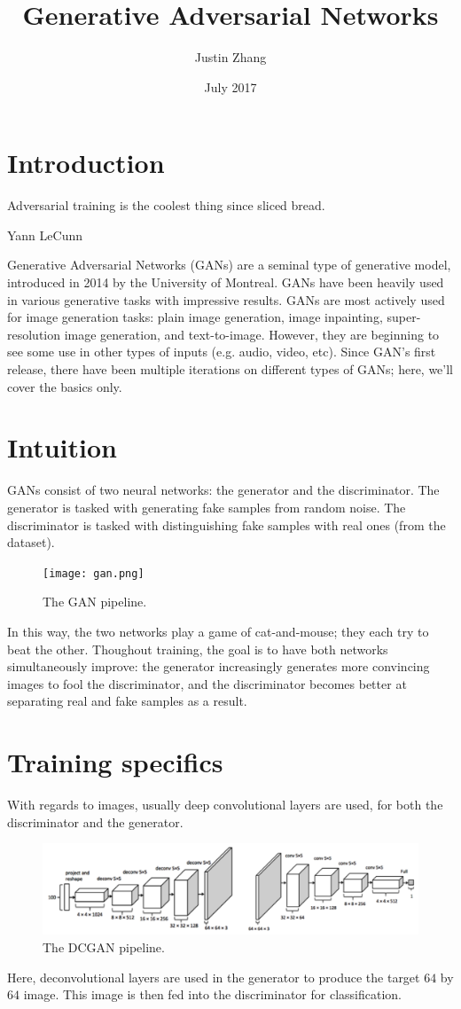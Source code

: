 \documentclass{article}
\title{Generative Adversarial Networks}
\author{Justin Zhang}
\date{July 2017}
\begin{document}
\maketitle

\section{Introduction}
\epigraph{Adversarial training is the coolest thing since sliced bread.}{Yann LeCunn}
    Generative Adversarial Networks (GANs) are a seminal type of generative model, introduced in 2014 by the University of Montreal. GANs have been heavily used in various generative tasks with impressive results. GANs are most actively used for image generation tasks: plain image generation, image inpainting, super-resolution image generation, and text-to-image. However, they are beginning to see some use in other types of inputs (e.g. audio, video, etc). Since GAN's first release, there have been multiple iterations on different types of GANs; here, we'll cover the basics only.
\section{Intuition}
    GANs consist of two neural networks: the generator and the discriminator. The generator is tasked with generating fake samples from random noise. The discriminator is tasked with distinguishing fake samples with real ones (from the dataset).
    \begin{center}
    \begin{figure}[H]
        \centerline{\texttt{[image: gan.png]}}
        \caption{The GAN pipeline.}
        \label{fig:gan}
    \end{figure}
    \end{center}
    In this way, the two networks play a game of cat-and-mouse; they each try to beat the other. Thoughout training, the goal is to have both networks simultaneously improve: the generator increasingly generates more convincing images to fool the discriminator, and the discriminator becomes better at separating real and fake samples as a result.
\section{Training specifics}
    With regards to images, usually deep convolutional layers are used, for both the discriminator and the generator.
    \begin{figure}[H]
        \centerline{\includegraphics[scale=0.4]{dcgan.png}}
        \caption{The DCGAN pipeline.}
        \label{fig:dcgan}
    \end{figure}
    Here, deconvolutional layers are used in the generator to produce the target $64$ by $64$ image. This image is then fed into the discriminator for classification.
    
\end{document}
